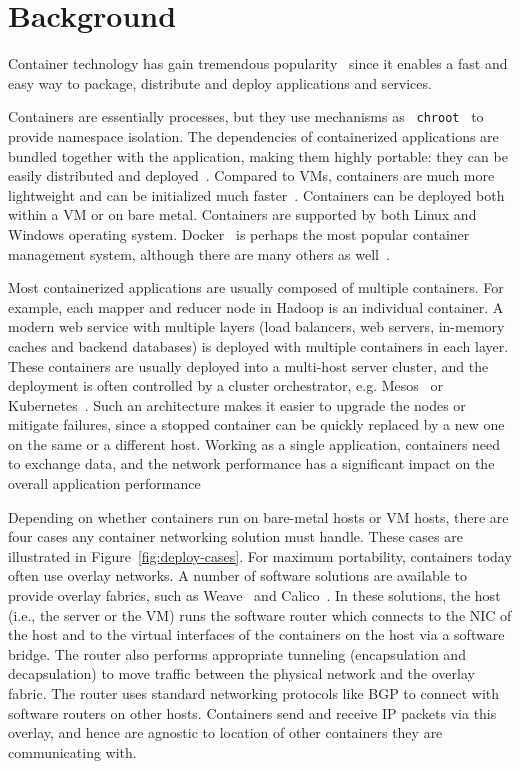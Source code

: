 \section{Background}
\label{sec:background}

Container technology has gain tremendous popularity~\cite{iron-io-300-million,docker-2billion,docker-datadog}
since it enables a fast and easy way to package, distribute and deploy
applications and services. 

Containers are essentially processes, but they use mechanisms as {\tt
chroot}~\cite{chroot} to provide namespace isolation. The dependencies of
containerized applications are bundled together with the application, making
them highly portable: they can be easily distributed and deployed~\cite{docker}.
Compared to VMs, containers are much more lightweight and can be initialized
much faster~\cite{docker:linjournal,jitsu}. Containers can be deployed both within a VM or
on bare metal. Containers are supported by both Linux and Windows operating
system. Docker~\cite{docker} is perhaps the most popular container management
system, although there are many others as well~\cite{coreos,kubernetes}.

Most containerized applications are usually composed of multiple containers.
For example, each mapper and reducer node in Hadoop \cite{hadoop} is an
individual container. A modern web service with multiple layers (load balancers,
web servers, in-memory caches and backend databases) is deployed with multiple
containers in each layer. These containers are usually deployed into a
multi-host server cluster, and the deployment is often controlled by a cluster
orchestrator, e.g. Mesos~\cite{mesos} or Kubernetes~\cite{kubernetes}. Such an architecture makes it easier to
upgrade the nodes or mitigate failures, since a stopped container can be quickly
replaced by a new one on the same or a different host. Working as a single
application, containers need to exchange data, and the network performance has a
significant impact on the overall application performance~\cite{varys,orchestra,reining,chowdhury}

Depending on whether containers run on bare-metal hosts or VM hosts, there are
four cases any container networking solution must handle. These cases are
illustrated in Figure~\ref{fig:deploy-cases}. For maximum portability,
containers today often use overlay networks.
A number of software solutions are available to provide overlay fabrics,
such as Weave~\cite{weave} and Calico~\cite{calico}. In these solutions, the
host (i.e., the server or the VM) runs the software router which connects to
the NIC of the host and to the virtual interfaces of the
containers on the host via a software bridge. The router also performs appropriate tunneling
(encapsulation and decapsulation) to move traffic between the physical network
and the overlay fabric. The router uses standard networking protocols like BGP
to connect with software routers on other hosts. Containers send and receive IP
packets via this overlay, and hence are agnostic to location of other containers
they are communicating with.


